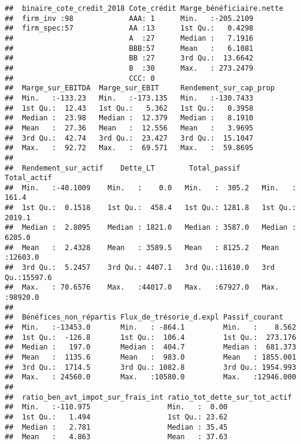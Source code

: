 \documentclass[
]{article}
\begin{document}
\begin{verbatim}
##  binaire_cote_credit_2018 Cote_crédit Marge_bénéficiaire.nette
##  firm_inv :98             AAA: 1      Min.   :-205.2109       
##  firm_spec:57             AA :13      1st Qu.:   0.4298       
##                           A  :27      Median :   7.1916       
##                           BBB:57      Mean   :   6.1081       
##                           BB :27      3rd Qu.:  13.6642       
##                           B  :30      Max.   : 273.2479       
##                           CCC: 0                              
##  Marge_sur_EBITDA  Marge_sur_EBIT     Rendement_sur_cap_prop
##  Min.   :-133.23   Min.   :-173.135   Min.   :-130.7433     
##  1st Qu.:  12.43   1st Qu.:   5.362   1st Qu.:   0.3958     
##  Median :  23.98   Median :  12.379   Median :   8.1910     
##  Mean   :  27.36   Mean   :  12.556   Mean   :   3.9695     
##  3rd Qu.:  42.74   3rd Qu.:  23.427   3rd Qu.:  15.1047     
##  Max.   :  92.72   Max.   :  69.571   Max.   :  59.8695     
##                                                             
##  Rendement_sur_actif    Dette_LT        Total_passif      Total_actif     
##  Min.   :-40.1009    Min.   :    0.0   Min.   :  305.2   Min.   :  161.4  
##  1st Qu.:  0.1518    1st Qu.:  458.4   1st Qu.: 1281.8   1st Qu.: 2019.1  
##  Median :  2.8095    Median : 1821.0   Median : 3587.0   Median : 6205.0  
##  Mean   :  2.4328    Mean   : 3589.5   Mean   : 8125.2   Mean   :12603.0  
##  3rd Qu.:  5.2457    3rd Qu.: 4407.1   3rd Qu.:11610.0   3rd Qu.:15597.6  
##  Max.   : 70.6576    Max.   :44017.0   Max.   :67927.0   Max.   :98920.0  
##                                                                           
##  Bénéfices_non_répartis Flux_de_trésorie_d.expl Passif_courant     
##  Min.   :-13453.0       Min.   : -864.1         Min.   :    8.562  
##  1st Qu.:  -126.8       1st Qu.:  106.4         1st Qu.:  273.176  
##  Median :   197.0       Median :  404.7         Median :  681.373  
##  Mean   :  1135.6       Mean   :  983.0         Mean   : 1855.001  
##  3rd Qu.:  1714.5       3rd Qu.: 1082.8         3rd Qu.: 1954.993  
##  Max.   : 24560.0       Max.   :10580.0         Max.   :12946.000  
##                                                                    
##  ratio_ben_avt_impot_sur_frais_int ratio_tot_dette_sur_tot_actif
##  Min.   :-110.975                  Min.   :  0.00               
##  1st Qu.:   1.494                  1st Qu.: 23.62               
##  Median :   2.781                  Median : 35.45               
##  Mean   :   4.863                  Mean   : 37.63               

\end{verbatim}
\end{document}

